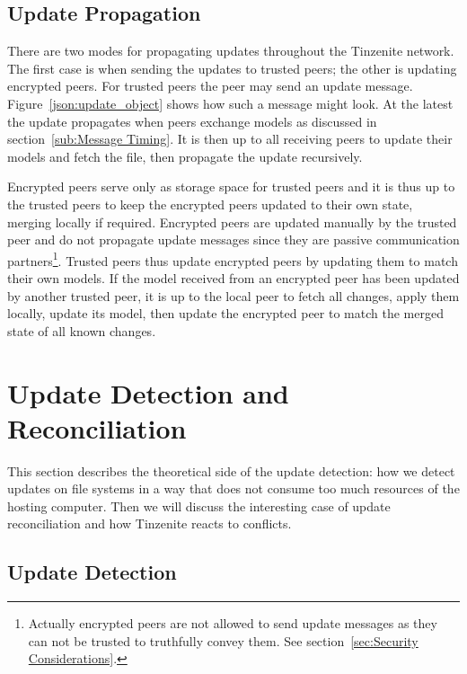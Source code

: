 \subsection{Update Propagation}
\label{sub:Update Propagation}

There are two modes for propagating updates throughout the Tinzenite network.
The first case is when sending the updates to trusted peers; the other is updating encrypted peers.
For trusted peers the peer may send an update message.
Figure~\ref{json:update_object} shows how such a message might look.
At the latest the update propagates when peers exchange models as discussed in section~\ref{sub:Message Timing}.
It is then up to all receiving peers to update their models and fetch the file, then propagate the update recursively.

Encrypted peers serve only as storage space for trusted peers and it is thus up to the trusted peers to keep the encrypted peers updated to their own state, merging locally if required.
Encrypted peers are updated manually by the trusted peer and do not propagate update messages since they are passive communication partners\footnote{Actually encrypted peers are not allowed to send update messages as they can not be trusted to truthfully convey them. See section~\ref{sec:Security Considerations}.}.
Trusted peers thus update encrypted peers by updating them to match their own models.
If the model received from an encrypted peer has been updated by another trusted peer, it is up to the local peer to fetch all changes, apply them locally, update its model, then update the encrypted peer to match the merged state of all known changes.

\section{Update Detection and Reconciliation}
\label{sec:Update Detection and Reconciliation}

This section describes the theoretical side of the update detection: how we detect updates on file systems in a way that does not consume too much resources of the hosting computer.
Then we will discuss the interesting case of update reconciliation and how Tinzenite reacts to conflicts.

\subsection{Update Detection}
\label{sub:Update Detection}


